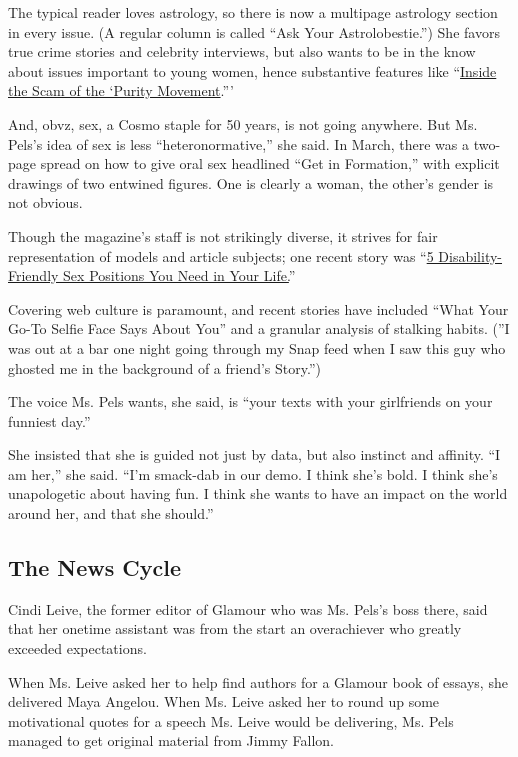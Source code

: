 The typical reader loves astrology, so there is now a multipage
astrology section in every issue. (A regular column is called ``Ask Your
Astrolobestie.'') She favors true crime stories and celebrity
interviews, but also wants to be in the know about issues important to
young women, hence substantive features like
``\href{https://www.cosmopolitan.com/politics/a26026217/sexual-abstinence-joshua-harris-purity-movement-scam/}{Inside
the Scam of the `Purity Movement}.'''

And, obvz, sex, a Cosmo staple for 50 years, is not going anywhere. But
Ms. Pels's idea of sex is less ``heteronormative,'' she said. In March,
there was a two-page spread on how to give oral sex headlined ``Get in
Formation,'' with explicit drawings of two entwined figures. One is
clearly a woman, the other's gender is not obvious.

Though the magazine's staff is not strikingly diverse, it strives for
fair representation of models and article subjects; one recent story was
``\href{https://www.cosmopolitan.com/sex-love/positions/g26723862/disability-sex-positions/}{5
Disability-Friendly Sex Positions You Need in Your Life.}''

Covering web culture is paramount, and recent stories have included
``What Your Go-To Selfie Face Says About You'' and a granular analysis
of stalking habits. (''I was out at a bar one night going through my
Snap feed when I saw this guy who ghosted me in the background of a
friend's Story.'')

The voice Ms. Pels wants, she said, is ``your texts with your
girlfriends on your funniest day.''

She insisted that she is guided not just by data, but also instinct and
affinity. ``I am her,'' she said. ``I'm smack-dab in our demo. I think
she's bold. I think she's unapologetic about having fun. I think she
wants to have an impact on the world around her, and that she should.''

\hypertarget{the-news-cycle}{%
\subsection{The News Cycle}\label{the-news-cycle}}

Cindi Leive, the former editor of Glamour who was Ms. Pels's boss there,
said that her onetime assistant was from the start an overachiever who
greatly exceeded expectations.

When Ms. Leive asked her to help find authors for a Glamour book of
essays, she delivered Maya Angelou. When Ms. Leive asked her to round up
some motivational quotes for a speech Ms. Leive would be delivering, Ms.
Pels managed to get original material from Jimmy Fallon.

